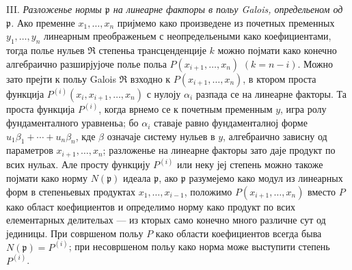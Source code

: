 ﻿\documentclass[11pt]{article}
\providecommand{\frakp}{\mathfrak p}
\providecommand{\frakR}{\mathfrak R}
\begin{document}
\noindent III. \emph{Разложенье нормы $\frakp$ на линеарне факторы в польу Galois, определьеном од $\frakp$.} Ако пременне $x_1,\ldots,x_n$ пријмемо како произведене из почетных пременных $y_1,\ldots,y_n$ линеарным преображеньем с неопредельеными како коефициентами, тогда полье нульев $\frakR$ степеньа трансценденције $k$ можно појмати како конечно алгебраично разширјујоче полье польа $P(x_{i+1},\ldots,x_n)$ $(k=n-i)$. Можно зато прејти к польу Galois $\frakR$ взходно к $P(x_{i+1},\ldots,x_n)$, в ктором проста функција $P^{(i)}(x_i,x_{i+1},\ldots,x_n)$ с нулоју $\alpha_i$ разпада се на линеарне факторы. Та проста функција $P^{(i)}$, когда врнемо се к почетным пременным $y$, игра ролу фундаменталного уравненьа; бо $\alpha_i$ ставаје равно фундаменталној форме $u_1\beta_1+\cdots+u_n\beta_n$, кде $\beta$ означаје систему нульев в $y$, алгебраично зависну од параметров $x_{i+1},\ldots,x_n$; разложенье на линеарне факторы зато даје продукт по всих нульах. Але просту функцију $P^{(i)}$ или неку јеј степень можно такоже појмати како норму $N(\frakp)$ идеала $\frakp$, ако $\frakp$ разумејемо како модул из линеарных форм в степеньевых продуктах $x_1,\ldots,x_{i-1}$, положимо $P(x_{i+1},\ldots,x_n)$ вместо $P$ како област коефициентов и определимо норму како продукт по всих елементарных делительах --- из кторых само конечно много различне сут од јединицы. При совршеном польу $P$ како области коефициентов всегда быва $N(\frakp)=P^{(i)}$; при несовршеном польу како норма може выступити степень $P^{(i)}$.
\end{document}
